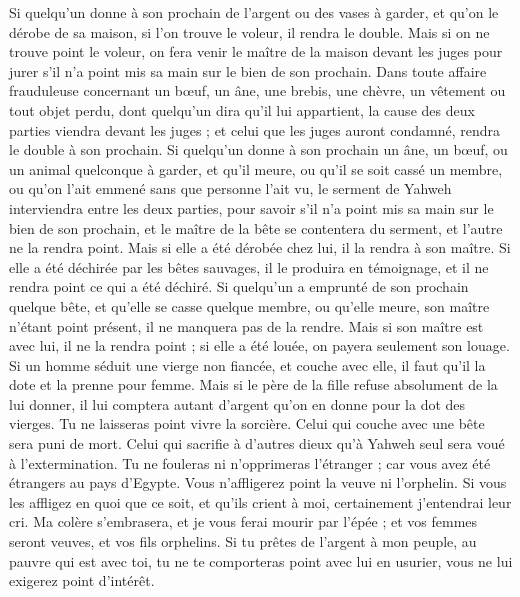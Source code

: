 \begin{multicols}{2}
Si quelqu'un donne à son prochain de l'argent ou des vases à garder, et qu'on le dérobe de sa maison, si l'on trouve le voleur, il rendra le double.
Mais si on ne trouve point le voleur, on fera venir le maître de la maison devant les juges pour jurer s'il n'a point mis sa main sur le bien de son prochain.
Dans toute affaire frauduleuse concernant un bœuf, un âne, une brebis, une chèvre, un vêtement ou tout objet perdu, dont quelqu'un dira qu'il lui appartient, la cause des deux parties viendra devant les juges ; et celui que les juges auront condamné, rendra le double à son prochain.
Si quelqu'un donne à son prochain un âne, un bœuf, ou un animal quelconque à garder, et qu'il meure, ou qu'il se soit cassé un membre, ou qu'on l'ait emmené sans que personne l'ait vu,
le serment de Yahweh interviendra entre les deux parties, pour savoir s'il n'a point mis sa main sur le bien de son prochain, et le maître de la bête se contentera du serment, et l'autre ne la rendra point.
Mais si elle a été dérobée chez lui, il la rendra à son maître.
Si elle a été déchirée par les bêtes sauvages, il le produira en témoignage, et il ne rendra point ce qui a été déchiré.
Si quelqu'un a emprunté de son prochain quelque bête, et qu'elle se casse quelque membre, ou qu'elle meure, son maître n'étant point présent, il ne manquera pas de la rendre.
Mais si son maître est avec lui, il ne la rendra point ; si elle a été louée, on payera seulement son louage.
Si un homme séduit une vierge non fiancée, et couche avec elle, il faut qu'il la dote et la prenne pour femme.
Mais si le père de la fille refuse absolument de la lui donner, il lui comptera autant d'argent qu'on en donne pour la dot des vierges.
Tu ne laisseras point vivre la sorcière.
Celui qui couche avec une bête sera puni de mort.
Celui qui sacrifie à d'autres dieux qu'à Yahweh seul sera voué à l’extermination.
Tu ne fouleras ni n'opprimeras l'étranger ; car vous avez été étrangers au pays d'Egypte.
Vous n'affligerez point la veuve ni l'orphelin.
Si vous les affligez en quoi que ce soit, et qu'ils crient à moi, certainement j'entendrai leur cri.
Ma colère s'embrasera, et je vous ferai mourir par l'épée ; et vos femmes seront veuves, et vos fils orphelins.
Si tu prêtes de l'argent à mon peuple, au pauvre qui est avec toi, tu ne te comporteras point avec lui en usurier, vous ne lui exigerez point d’intérêt.

\end{multicols}
